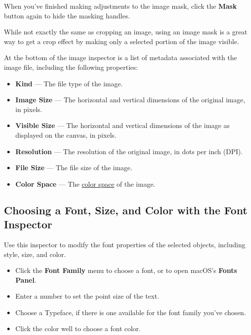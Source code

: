 \documentclass[../main.tex]{subfiles}
\begin{document}
\begin{itemize}
    When you've finished making adjustments to the image mask, click the \textbf{Mask} button
    again to hide the masking handles.
\end{itemize}

\begin{ogtip}
  While not exactly the same as cropping an image, using an image mask is a great way to get a
  crop effect by making only a selected portion of the image visible.
\end{ogtip}

At the bottom of the image inspector is a list of metadata associated with the image file,
including the following properties:

\begin{itemize}
  \item \textbf{Kind} --- The file type of the image.
  \item \textbf{Image Size} --- The horizontal and vertical dimensions of the original image, in
    pixels.
  \item \textbf{Visible Size} --- The horizontal and vertical dimensions of the image as
    displayed on the canvas, in pixels.
  \item \textbf{Resolution} --- The resolution of the original image, in dots per inch (DPI).
  \item \textbf{File Size} --- The file size of the image.
  \item \textbf{Color Space} --- The \href{https://en.wikipedia.org/wiki/Color_space}{color
    space} of the image.
\end{itemize}

\subsection{Choosing a Font, Size, and Color with the Font Inspector}

Use this inspector to modify the font properties of the selected objects, including style, size,
and color.


\begin{itemize}
  \item Click the \textbf{Font Family} menu to choose a font, or to open macOS's \textbf{Fonts
    Panel}.


  \item Enter a number to set the point size of the text.
  \item Choose a Typeface, if there is one available for the font family you've chosen.
  \item Click the color well to choose a font color.
\end{itemize}
\end{document}
